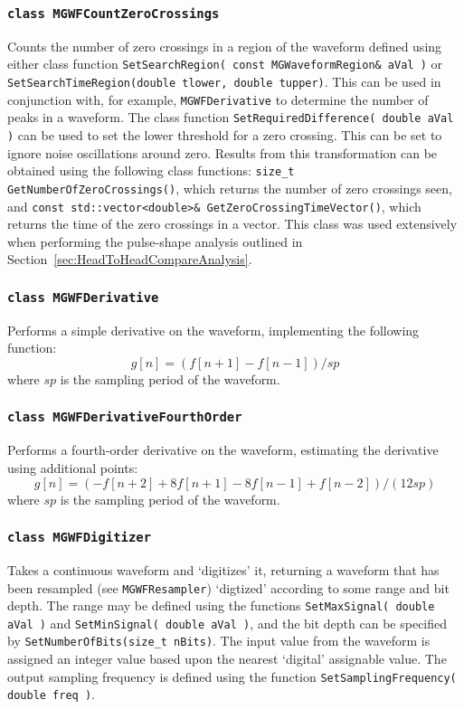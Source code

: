 			\subsubsection{\lstinline!class MGWFCountZeroCrossings!}
Counts the number of zero crossings in a region of the waveform defined using either class function \lstinline!SetSearchRegion( const MGWaveformRegion& aVal )! or \lstinline!SetSearchTimeRegion(double tlower, double tupper)!.  This can be used in conjunction with, for example, \lstinline!MGWFDerivative! to determine the number of peaks in a waveform.  The class function \lstinline!SetRequiredDifference( double aVal )! can be used to set the lower threshold for a zero crossing.  This can be set to ignore noise oscillations around zero.  Results from this transformation can be obtained using the following class functions: \lstinline!size_t GetNumberOfZeroCrossings()!, which returns the number of zero crossings seen, and \lstinline!const std::vector<double>& GetZeroCrossingTimeVector()!, which returns the time of the zero crossings in a vector.  This class was used extensively when performing the pulse-shape analysis outlined in Section~\ref{sec:HeadToHeadCompareAnalysis}.
			
			\subsubsection{\lstinline!class MGWFDerivative!}
Performs a simple derivative on the waveform, implementing the following function:
				\[
					g[n] = (f[n+1] - f[n-1])/sp
				\]
where $sp$ is the sampling period of the waveform.

			\subsubsection{\lstinline!class MGWFDerivativeFourthOrder!}
Performs a fourth-order derivative on the waveform, estimating the derivative using additional points:
				\[
					g[n] = ( -f[n+2] + 8 f[n+1] - 8 f[n-1] + f[n-2])/(12 sp)
				\]
where $sp$ is the sampling period of the waveform.
				
			\subsubsection{\lstinline!class MGWFDigitizer!}
Takes a continuous waveform and `digitizes' it, returning a waveform that has been resampled (see \lstinline!MGWFResampler!) `digtized' according to some range and bit depth.  The range may be defined using the functions \lstinline!SetMaxSignal( double aVal )! and \lstinline!SetMinSignal( double aVal )!, and the bit depth can be specified by \lstinline!SetNumberOfBits(size_t nBits)!.  The input value from the waveform is assigned an integer value based upon the nearest `digital' assignable value.  The output sampling frequency is defined using the function \lstinline!SetSamplingFrequency( double freq )!.  
			
